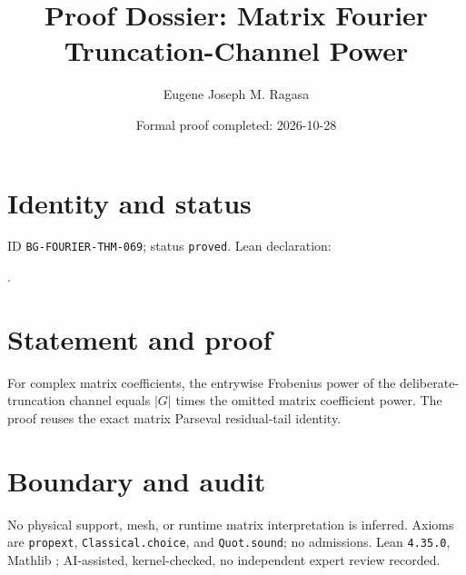 \documentclass[11pt]{article}
\title{Proof Dossier: Matrix Fourier Truncation-Channel Power}\author{Eugene Joseph M. Ragasa}\date{Formal proof completed: 2026-10-28}
\begin{document}
\raggedright\maketitle
\section{Identity and status}
ID \texttt{BG-FOURIER-THM-069}; status \texttt{proved}. Lean declaration:
\par{}.
\section{Statement and proof}
For complex matrix coefficients, the entrywise Frobenius power of the deliberate-truncation channel equals $|G|$ times the omitted matrix coefficient power. The proof reuses the exact matrix Parseval residual-tail identity.
\section{Boundary and audit}
No physical support, mesh, or runtime matrix interpretation is inferred. Axioms are \texttt{propext}, \texttt{Classical.choice}, and \texttt{Quot.sound}; no admissions. Lean \texttt{4.35.0}, Mathlib {\scriptsize{}}; AI-assisted, kernel-checked, no independent expert review recorded.
\end{document}
